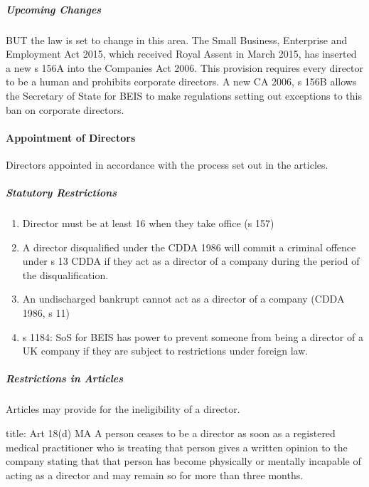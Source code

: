 \documentclass[
]{article}
\newenvironment{Shaded}{}{}
\newcommand{\NormalTok}[1]{#1}
\providecommand{\tightlist}{%
  \setlength{\itemsep}{0pt}\setlength{\parskip}{0pt}}
\begin{document}
\hypertarget{upcoming-changes}{%
\subparagraph{Upcoming Changes}\label{upcoming-changes}}

BUT the law is set to change in this area. The Small Business,
Enterprise and Employment Act 2015, which received Royal Assent in March
2015, has inserted a new s 156A into the Companies Act 2006. This
provision requires every director to be a human and prohibits corporate
directors. A new CA 2006, s 156B allows the Secretary of State for BEIS
to make regulations setting out exceptions to this ban on corporate
directors.

\hypertarget{appointment-of-directors}{%
\paragraph{Appointment of Directors}\label{appointment-of-directors}}

Directors appointed in accordance with the process set out in the
articles.

\hypertarget{statutory-restrictions}{%
\subparagraph{Statutory Restrictions}\label{statutory-restrictions}}

\begin{enumerate}
\def\labelenumi{\arabic{enumi}.}
\tightlist
\item
  Director must be at least 16 when they take office (s 157)
\item
  A director disqualified under the CDDA 1986 will commit a criminal
  offence under s 13 CDDA if they act as a director of a company during
  the period of the disqualification.
\item
  An undischarged bankrupt cannot act as a director of a company (CDDA
  1986, s 11)
\item
  s 1184: SoS for BEIS has power to prevent someone from being a
  director of a UK company if they are subject to restrictions under
  foreign law.
\end{enumerate}

\hypertarget{restrictions-in-articles}{%
\subparagraph{Restrictions in Articles}\label{restrictions-in-articles}}

Articles may provide for the ineligibility of a director.

\begin{Shaded}
\begin{Highlighting}[]
\NormalTok{title: Art 18(d) MA}
\NormalTok{A person ceases to be a director as soon as a registered medical practitioner who is treating that person gives a written opinion to the company stating that that person has become physically or mentally incapable of acting as a director and may remain so for more than three months.}
\end{Highlighting}
\end{Shaded}
\end{document}
